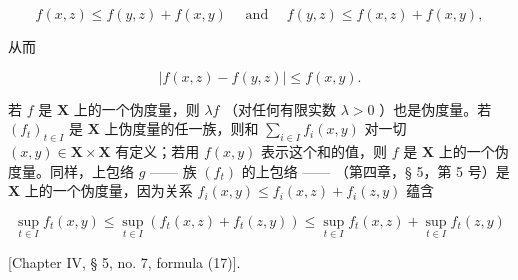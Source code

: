 \[
f (x, z) \leqslant f (y, z) + f (x, y) \quad \text { and } \quad f (y, z) \leqslant f (x, z) + f (x, y),
\]

从而

\[
\left| f (x, z) - f (y, z) \right| \leqslant f (x, y).\tag{1}
\]

若 \(f\) 是 \(\mathbf{X}\) 上的一个伪度量，则 \(\lambda f\) （对任何有限实数 \(\lambda > 0\) ）也是伪度量。若 \((f_t)_{t \in I}\) 是 \(\mathbf{X}\) 上伪度量的任一族，则和 \(\sum_{i \in I} f_i(x, y)\) 对一切 \((x, y) \in \mathbf{X} \times \mathbf{X}\) 有定义；若用 \(f(x, y)\) 表示这个和的值，则 \(f\) 是 \(\mathbf{X}\) 上的一个伪度量。同样，上包络 \(g\) —— 族 \((f_t)\) 的上包络 —— （第四章，§ 5，第 5 号）是 \(\mathbf{X}\) 上的一个伪度量，因为关系 \(f_i(x, y) \leqslant f_i(x, z) + f_i(z, y)\) 蕴含

\[
\sup _ {t \in I} f _ {t} (x, y) \leqslant \sup _ {t \in I} \left(f _ {t} (x, z) + f _ {t} (z, y)\right) \leqslant \sup _ {t \in I} f _ {t} (x, z) + \sup _ {t \in I} f _ {t} (z, y)
\]

{[}Chapter IV, § 5, no. 7, formula (17){]}.

